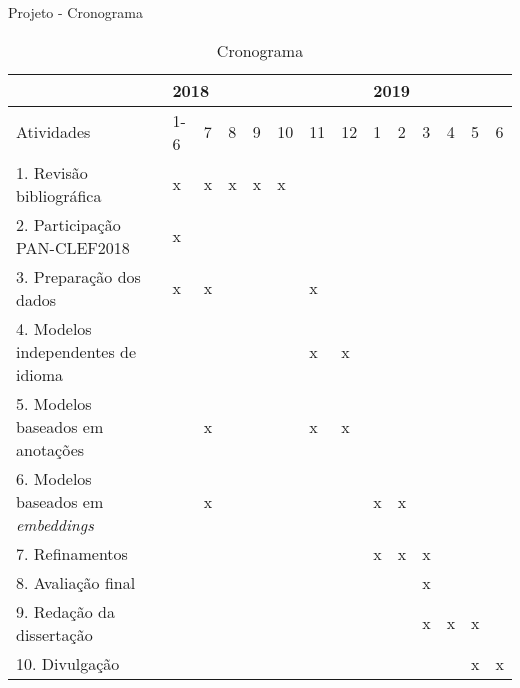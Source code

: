 \begin{frame}{Projeto - Cronograma}


\setlength{\tabcolsep}{3pt}\selectFont
\begin{table}[]
	\centering
	\caption{Cronograma}
		\begin{tabular}{|l|l|l|l|l|l|l|l|l|l|l|l|l|l|}
			\toprule
			& \multicolumn{7}{l|}{2018}      & \multicolumn{6}{l|}{2019} \\ \midrule
			Atividades                              & 1-6 & 7 & 8 & 9 & 10 & 11 & 12 & 1 & 2 & 3 & 4 & 5 & 6     \\ \hline
			1. Revisão bibliográfica                & x   & x & x & x & x  &    &    &   &   &   &   &   &       \\ \hline
			2. Participação PAN-CLEF2018            & x   &   &   &   &    &    &    &   &   &   &   &   &       \\ \hline
			3. Preparação dos dados                 & x   & x &   &   &    & x  &    &   &   &   &   &   &       \\ \hline
			4. Modelos independentes de idioma      &     &   &   &   &    & x  & x  &   &   &   &   &   &       \\ \hline
			5. Modelos baseados em anotações        &     & x &   &   &    & x  & x  &   &   &   &   &   &       \\ \hline
			6. Modelos baseados em {\it embeddings} &     & x &   &   &    &    &    & x & x &   &   &   &       \\ \hline
			7. Refinamentos                         &     &   &   &   &    &    &    & x & x & x &   &   &       \\ \hline
			8. Avaliação final                      &     &   &   &   &    &    &    &   &   & x &   &   &       \\ \hline
			9. Redação da dissertação               &     &   &   &   &    &    &    &   &   & x & x & x &       \\ \hline
			10. Divulgação                          &     &   &   &   &    &    &    &   &   &   &   & x & x     \\ \bottomrule
		\end{tabular}
	\end{table}
\end{frame}
